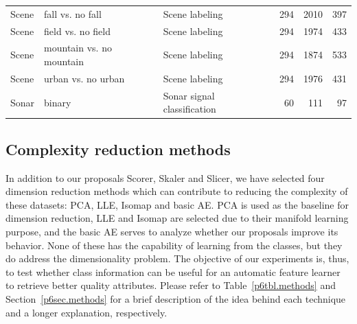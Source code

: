 \begin{table}[hbtp]
\begin{tabular}{p{2.5cm}p{3.5cm}p{5.2cm}rrr}
      Scene \cite{boutell2004learning}                           & fall vs. no fall          & Scene labeling                            & 294       & 2010      & 397       \\
      Scene \cite{boutell2004learning}                           & field vs. no field        & Scene labeling                            & 294       & 1974      & 433       \\
      Scene \cite{boutell2004learning}                           & mountain vs. no mountain  & Scene labeling                            & 294       & 1874      & 533       \\
      Scene \cite{boutell2004learning}                           & urban vs. no urban        & Scene labeling                            & 294       & 1976      & 431       \\
      Sonar \cite{gorman1988analysis}                            & binary                    & Sonar signal classification               & 60        & 111       & 97
      \\   \bottomrule
    \end{tabular}
  \end{table}

\fi

\subsection{Complexity reduction methods}

In addition to our proposals Scorer, Skaler and Slicer, we have selected four dimension reduction methods which can contribute to reducing the complexity of these datasets: PCA, LLE, Isomap and basic AE. PCA is used as the baseline for dimension reduction, LLE and Isomap are selected due to their manifold learning purpose, and the basic AE serves to analyze whether our proposals improve its behavior. None of these has the capability of learning from the classes, but they do address the dimensionality problem. The objective of our experiments is, thus, to test whether class information can be useful for an automatic feature learner to retrieve better quality attributes. Please refer to Table~\ref{p6tbl.methods} and Section~\ref{p6sec.methods} for a brief description of the idea behind each technique and a longer explanation, respectively.

